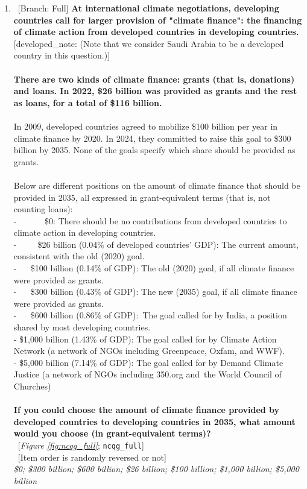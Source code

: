 \begin{enumerate}[resume]
\item ~[Branch: Full] \label{q:ncqg_full} \textbf{At international climate negotiations, developing countries call for larger provision of "climate finance": the financing of climate action from developed countries in developing countries.} [developed\_note: (Note that we consider Saudi Arabia to be a developed country in this question.)]\\\\\textbf{There are two kinds of climate finance: grants (that is, donations) and loans. In 2022, \$26 billion was provided as grants and the rest as loans, for a total of \$116 billion.~}\\\\In 2009, developed countries agreed to mobilize \$100 billion per year in climate finance by 2020. In 2024, they committed to raise this goal to \$300 billion by 2035. None of the goals specify which share should be provided as grants.\\\\Below are different positions on the amount of climate finance that should be provided in 2035, all expressed in grant-equivalent terms (that is, not counting loans):\\-~ ~ ~ ~ \$0: There should be no contributions from developed countries to climate action in developing countries.\\-~ ~ ~ \$26 billion (0.04\% of developed countries' GDP): The current amount, consistent with the old (2020) goal.\\-~ ~ \$100 billion (0.14\% of GDP): The old (2020) goal, if all climate finance were provided as grants.\\-~ ~ \$300 billion (0.43\% of GDP): The new (2035) goal, if all climate finance were provided as grants.\\-~ ~ \$600 billion (0.86\% of GDP):~The goal called for by India, a position shared by most developing countries.\\- \$1,000 billion (1.43\% of GDP): The goal called for by Climate Action Network (a network of NGOs including Greenpeace, Oxfam, and WWF).\\- \$5,000 billion (7.14\% of GDP): The goal called for by Demand Climate Justice (a network of NGOs including 350.org and~the World Council of Churches)\\\\\textbf{If you could choose the amount of climate finance provided by developed countries to developing countries in 2035, what amount would you choose (in grant-equivalent terms)?}\\ 
~[\textit{Figure \ref{fig:ncqg_full}}; 
\verb|ncqg_full|]\\
~[Item order is randomly reversed or not]
  \\ \textit{\$0; \$300 billion; \$600 billion; \$26 billion; \$100 billion; \$1,000 billion; \$5,000 billion}


\end{enumerate}
